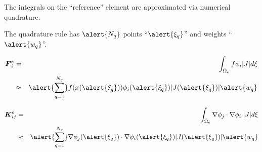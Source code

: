     
\begin{frame}[t]
	\begin{block}{}
	\begin{itemize}    
	\item{
	  The integrals on the ``reference'' element are approximated via numerical
	  quadrature.
	}
	  \visible<2->
	      {
	      \item{The quadrature rule has $\alert{N_q}$ points
		``$\alert{\xi_q}$'' and weights ``$\alert{w_q}$''.}
	      }
	\end{itemize}
	\end{block}
{
	\begin{eqnarray}
	  \nonumber
		\bv{F}^e_{i} &=&
		\int_{\hat{\Omega}_e} f \phi_i |J| d\xi
		\\ \nonumber
		    &\approx&
		    \alert{\sum_{q=1}^{N_q}}
		    f(x(\alert{\xi_q})) \phi_i(\alert{\xi_q})
		    |J(\alert{\xi_q})| \alert{w_q}
	\end{eqnarray}
}

{
	\begin{eqnarray}
	  \nonumber
		\bv{K}^e_{ij} &=&
		\int_{\hat{\Omega}_e}
		\nabla \phi_j \cdot
		\nabla \phi_i \;|J| d\xi
		\\ \nonumber
		    &\approx&
		    \alert{\sum_{q=1}^{N_q}}
		    \nabla \phi_j(\alert{\xi_q}) \cdot
		    \nabla \phi_i(\alert{\xi_q})
		    |J(\alert{\xi_q})| \alert{w_q}
	\end{eqnarray}
}
\end{frame}
    

